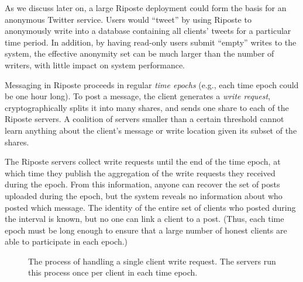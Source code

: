 \documentclass[10pt,twocolumn]{article}
\newcommand{\name}{Riposte\xspace}
\begin{document}
As we discuss later on, a large \name deployment 
could form the basis for an anonymous Twitter service.
Users would ``tweet'' by using \name to anonymously 
write into a database containing all clients' tweets for
a particular time period.
In addition, by having read-only users submit ``empty''
writes to the system, the effective anonymity set can
be much larger than the number of writers, with little impact
on system performance. 


\medskip

Messaging in \name proceeds in regular {\em time epochs}
(e.g., each time epoch could be one hour long).
To post a message, the client generates 
a {\em write request}, cryptographically splits it into many
shares, and sends one share to each of the \name servers.
A coalition of servers smaller than a certain threshold cannot
learn anything about the client's message or write location given
its subset of the shares.

The \name servers collect write requests until the end of the time epoch,
at which time they publish the aggregation of the write requests they received
during the epoch.
From this information, anyone can recover the set of posts uploaded during
the epoch, but the system reveals no information about who posted which message.  
The identity of the entire set of clients who
posted during the interval is known, but no one can link a client to a post.
(Thus, each time epoch must be long enough to ensure that a large
number of honest clients are able to participate in each epoch.)

\begin{figure*}
  \centering
  \quad
  \quad
  \quad

    \caption{The process of handling a single client write request. 
        The servers run this process once per client in each time epoch.}
    \label{fig:arch}
\end{figure*}
\end{document}
